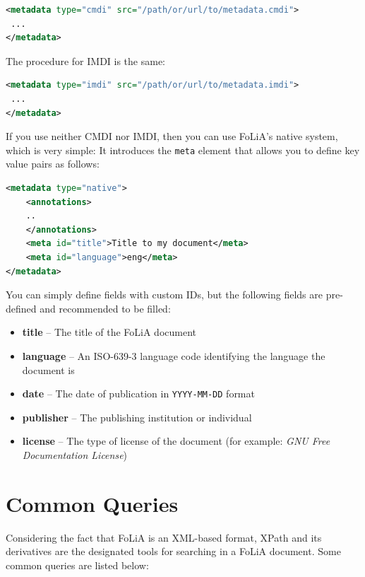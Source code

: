 \documentclass[a4paper,12pt]{report}
\begin{document}
\begin{lstlisting}[language=xml]
<metadata type="cmdi" src="/path/or/url/to/metadata.cmdi">
 ...
</metadata>
\end{lstlisting}

The procedure for IMDI is the same:

\begin{lstlisting}[language=xml]
<metadata type="imdi" src="/path/or/url/to/metadata.imdi">
 ...
</metadata>
\end{lstlisting}

If you use neither CMDI nor IMDI, then you can use FoLiA's native system, which is very simple: It introduces the \texttt{meta} element that allows you to define key value pairs as follows:

\begin{lstlisting}[language=xml]
<metadata type="native">
    <annotations>
    ..
    </annotations>
    <meta id="title">Title to my document</meta>
    <meta id="language">eng</meta>
</metadata>
\end{lstlisting}

You can simply define fields with custom IDs, but the following fields are pre-defined and recommended to be filled:

\begin{itemize}
\item \textbf{title} -- The title of the FoLiA document
\item \textbf{language} -- An ISO-639-3 language code identifying the language the document is 
\item \textbf{date} -- The date of publication in \texttt{YYYY-MM-DD} format
\item \textbf{publisher} -- The publishing institution or individual
\item \textbf{license} -- The type of license of the document (for example: \emph{GNU Free Documentation License})
\end{itemize}



\appendix
\chapter{Common Queries}

Considering the fact that FoLiA is an XML-based format, XPath and its derivatives are the designated tools for searching in a FoLiA document. Some common queries are listed below:
\end{document}
